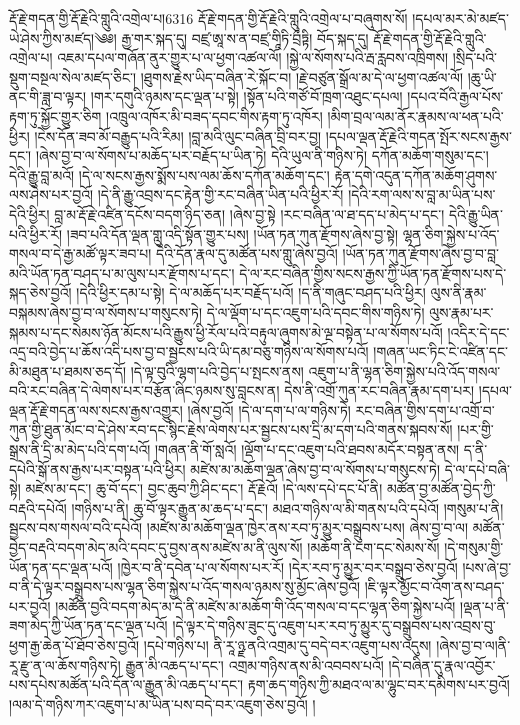 རྡོ་རྗེ་གདན་གྱི་རྡོ་རྗེའི་གླུའི་འགྲེལ་པ།6316 རྡོ་རྗེ་གདན་གྱི་རྡོ་རྗེའི་གླུའི་འགྲེལ་པ་བཞུགས་སོ། །དཔལ་མར་མེ་མཛད་ཡེ་ཤེས་ཀྱིས་མཛད།༄༅། རྒྱ་གར་སྐད་དུ། བཛྲ་ཨཱ་ས་ན་བཛྲ་གཱིཏི་བྲྀཏྟི། བོད་སྐད་དུ། རྡོ་རྗེ་གདན་གྱི་རྡོ་རྗེའི་གླུའི་འགྲེལ་པ། འཇམ་དཔལ་གཞོན་ནུར་གྱུར་པ་ལ་ཕྱག་འཚལ་ལོ། །སྐྱེ་ལ་སོགས་པའི་རྦ་རླབས་འཁྲིགས། །སྲིད་པའི་སྡུག་བསྔལ་སེལ་མཛད་ཅིང་། །ཐུགས་རྗེས་ཡིད་བཞིན་རེ་སྐོང་བ། །རྗེ་བཙུན་སྒྲོལ་མ་དེ་ལ་ཕྱག་འཚལ་ལོ། །ཆུ་ཡི་ནང་གི་ཟླ་བ་ལྟར། །གར་དགུའི་ཉམས་དང་ལྡན་པ་སྟེ། །སྟོན་པའི་གཙོ་བོ་ཁྲག་འཐུང་དཔལ། །དཔའ་བོའི་རྒྱལ་པོས་རྟག་ཏུ་སྐྱོང་གྱུར་ཅིག །འཁྲུལ་འཁོར་མི་བཟད་དབང་གིས་རྟག་ཏུ་འཁོར། །མིག་བྲལ་ལམ་ནོར་རྣམས་ལ་ཕན་པའི་ཕྱིར། །ངེས་དོན་ཟབ་མོ་བརྒྱུད་པའི་རིམ། །བླ་མའི་ལུང་བཞིན་བྲི་བར་བྱ། །དཔལ་ལྡན་རྡོ་རྗེའི་གདན་སྤོར་སངས་རྒྱས་དང་། །ཞེས་བྱ་བ་ལ་སོགས་པ་མཆོད་པར་བརྗོད་པ་ཡིན་ཏེ། དེའི་ཡུལ་ནི་གཉིས་ཏེ། དཀོན་མཆོག་གསུམ་དང་། དེའི་རྒྱུ་བླ་མའོ། །དེ་ལ་སངས་རྒྱས་སྨོས་པས་ལམ་ཆོས་དཀོན་མཆོག་དང་། རྟེན་དགེ་འདུན་དཀོན་མཆོག་ཤུགས་ལས་ཤེས་པར་བྱའོ། །དེ་ནི་རྒྱུ་འབྲས་དང་རྟེན་གྱི་རང་བཞིན་ཡིན་པའི་ཕྱིར་རོ། །དེའི་རག་ལས་ས་བླ་མ་ཡིན་པས་དེའི་ཕྱིར། བླ་མ་རྡོ་རྗེ་འཛིན་དངོས་བདག་ཉིད་ཅན། །ཞེས་བྱ་སྟེ །རང་བཞིན་ལ་ཐ་དད་པ་མེད་པ་དང་། དེའི་རྒྱུ་ཡིན་པའི་ཕྱིར་རོ། །ཟབ་པའི་དོན་ལྡན་གླུ་འདི་སྟོན་གྱུར་པས། །ཡོན་ཏན་ཀུན་རྫོགས་ཞེས་བྱ་སྟེ། ལྷན་ཅིག་སྐྱེས་པ་འོད་གསལ་བ་དེ་རྒྱ་མཚོ་ལྟར་ཟབ་པ། དེའི་དོན་རྣལ་དུ་མཚོན་པས་གླུ་ཞེས་བྱའོ། །ཡོན་ཏན་ཀུན་རྫོགས་ཞེས་བྱ་བ་བླ་མའི་ཡོན་ཏན་བཤད་པ་མ་ལུས་པར་རྫོགས་པ་དང་། དེ་ལ་རང་བཞིན་གྱིས་སངས་རྒྱས་ཀྱི་ཡོན་ཏན་རྫོགས་པས་དེ་སྐད་ཅེས་བྱའོ། །དེའི་ཕྱིར་དམ་པ་སྟེ། དེ་ལ་མཆོད་པར་བརྗོད་པའོ། །ད་ནི་གཞུང་བཤད་པའི་ཕྱིར། ལུས་ནི་རྣམ་བསྐམས་ཞེས་བྱ་བ་ལ་སོགས་པ་གསུངས་ཏེ། དེ་ལ་ལྡོག་པ་དང་འཇུག་པའི་དབང་གིས་གཉིས་ཏེ། ལུས་རྣམ་པར་སྐམས་པ་དང་སེམས་ཉོན་མོངས་པའི་རྒྱུས་ཕྱི་རོལ་པའི་བརྟུལ་ཞུགས་མེ་ལྔ་བསྟེན་པ་ལ་སོགས་པའོ། །འདིར་དེ་དང་འདྲ་བའི་བྱེད་པ་ཆོས་འདི་པས་བྱ་བ་སྦྱངས་པའི་ཡི་དམ་བཅུ་གཉིས་ལ་སོགས་པའོ། །གཞན་ཡང་ཏིང་ངེ་འཛིན་དང་མི་མཐུན་པ་ཐམས་ཅད་དོ། །དེ་ལྟ་བུའི་ལྷག་པའི་བྱེད་པ་སྤངས་ནས། འཇུག་པ་ནི་ལྷན་ཅིག་སྐྱེས་པའི་འོད་གསལ་བའི་རང་བཞིན་དེ་ལེགས་པར་བརྩོན་ཞིང་ཉམས་སུ་བླངས་ན། དེས་ནི་འགྲོ་ཀུན་རང་བཞིན་རྣམ་དག་པར། །དཔལ་ལྡན་རྡོ་རྗེ་གདན་ལས་སངས་རྒྱས་འགྱུར། །ཞེས་བྱའོ། །དེ་ལ་དག་པ་ལ་གཉིས་ཏེ། རང་བཞིན་གྱིས་དག་པ་འགྲོ་བ་ཀུན་གྱི་ཐུན་མོང་བ་དེ་ཤེས་རབ་དང་སྙིང་རྗེས་ལེགས་པར་སྦྱངས་པས་དྲི་མ་དག་པའི་གནས་སྐབས་སོ། །པར་གྱི་སྒྲས་ནི་དྲི་མ་མེད་པའི་དག་པའོ། །གཞན་ནི་གོ་སླའོ། །ལྡོག་པ་དང་འཇུག་པའི་ཐབས་མདོར་བསྟན་ནས། ད་ནི་དཔེའི་སྒོ་ནས་རྒྱས་པར་བསྟན་པའི་ཕྱིར། མཛེས་མ་མཆོག་ལྡན་ཞེས་བྱ་བ་ལ་སོགས་པ་གསུངས་ཏེ། དེ་ལ་དཔེ་བཞི་སྟེ། མཛེས་མ་དང་། ཆུ་བོ་དང་། བྱང་ཆུབ་ཀྱི་ཤིང་དང་། རྡོ་རྗེའོ། །དེ་ལས་དཔེ་དང་པོ་ནི། མཚོན་བྱ་མཚོན་བྱེད་ཀྱི་བརྡའི་དཔེའོ། །གཉིས་པ་ནི། ཆུ་བོ་ལྟར་རྒྱུན་མ་ཆད་པ་དང་། མཐའ་གཉིས་ལ་མི་གནས་པའི་དཔེའོ། །གསུམ་པ་ནི། སྦྱངས་བས་གསལ་བའི་དཔེའོ། །མཛེས་མ་མཆོག་ལྡན་ཁྱེར་ནས་རབ་ཏུ་མྱུར་བསྒྲུབས་པས། ཞེས་བྱ་བ་ལ། མཚོན་བྱེད་བརྡའི་བདག་མེད་མའི་དབང་དུ་བྱས་ནས་མཛེས་མ་ནི་ལུས་སོ། །མཆོག་ནི་ངག་དང་སེམས་སོ། །དེ་གསུམ་གྱི་ཡོན་ཏན་དང་ལྡན་པའོ། །ཁྱེར་བ་ནི་དབེན་པ་ལ་སོགས་པར་རོ། །དེར་རབ་ཏུ་མྱུར་བར་བསྒྲུབ་ཅེས་བྱའོ། །པས་ཞེ་བྱ་བ་ནི་དེ་ལྟར་བསྒྲུབས་པས་ལྷན་ཅིག་སྐྱེས་པ་འོད་གསལ་ཉམས་སུ་མྱོང་ཞེས་བྱའོ། །ཇི་ལྟར་མྱོང་བ་འོག་ནས་བཤད་པར་བྱའོ། །མཚོན་བྱའི་བདག་མེད་མ་དེ་ནི་མཛེས་མ་མཆོག་གི་འོད་གསལ་བ་དང་ལྷན་ཅིག་སྐྱེས་པའོ། །ལྡན་པ་ནི་ཟག་མེད་ཀྱི་ཡོན་ཏན་དང་ལྡན་པའོ། །དེ་ལྟར་དེ་གཉིས་ཟུང་དུ་འཇུག་པར་རབ་ཏུ་མྱུར་དུ་བསྒྲུབས་པས་འབྲས་བུ་ཕྱག་རྒྱ་ཆེན་པོ་ཐོབ་ཅེས་བྱའོ། །དཔེ་གཉིས་པ། ནི་རཱ་ཉྫ་ནའི་འགྲམ་དུ་བདེ་བར་འཇུག་པས་འདུས། །ཞེས་བྱ་བ་ལ།ནི་རཱ་རྫུ་ན་ལ་ཆོས་གཉིས་ཏེ། རྒྱུན་མི་འཆད་པ་དང་། འགྲམ་གཉིས་ནས་མི་འབབས་པའོ། །དེ་བཞིན་དུ་རྣལ་འབྱོར་པས་དཔེས་མཚོན་པའི་དོན་ལ་རྒྱུན་མི་འཆད་པ་དང་། རྟག་ཆད་གཉིས་ཀྱི་མཐའ་ལ་མ་ལྷུང་བར་དམིགས་པར་བྱའོ། །ལམ་དེ་གཉིས་ཀར་འཇུག་པ་མ་ཡིན་པས་བདེ་བར་འཇུག་ཅེས་བྱའོ། །
